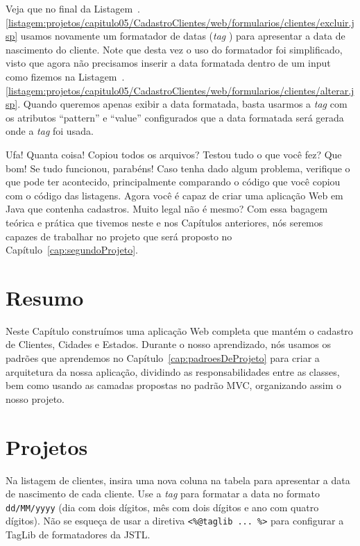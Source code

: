 
Veja que no final da Listagem~\thechapter.\ref{listagem:projetos/capitulo05/CadastroClientes/web/formularios/clientes/excluir.jsp} usamos novamente um formatador de datas (\textit{tag} ) para apresentar a data de nascimento do cliente. Note que desta vez o uso do formatador foi simplificado, visto que agora não precisamos inserir a data formatada dentro de um input como fizemos na Listagem~\thechapter.\ref{listagem:projetos/capitulo05/CadastroClientes/web/formularios/clientes/alterar.jsp}. Quando queremos apenas exibir a data formatada, basta usarmos a \textit{tag}  com os atributos ``pattern'' e ``value'' configurados que a data formatada será gerada onde a \textit{tag} foi usada.

Ufa! Quanta coisa! Copiou todos os arquivos? Testou tudo o que você fez? Que bom! Se tudo funcionou, parabéns! Caso tenha dado algum problema, verifique o que pode ter acontecido, principalmente comparando o código que você copiou com o código das listagens. Agora você é capaz de criar uma aplicação Web em Java que contenha cadastros. Muito legal não é mesmo? Com essa bagagem teórica e prática que tivemos neste e nos Capítulos anteriores, nós seremos capazes de trabalhar no projeto que será proposto no Capítulo~\ref{cap:segundoProjeto}.

\section{Resumo}

Neste Capítulo construímos uma aplicação Web completa que mantém o cadastro de Clientes, Cidades e Estados. Durante o nosso aprendizado, nós usamos os padrões que aprendemos no Capítulo~\ref{cap:padroesDeProjeto} para criar a arquitetura da nossa aplicação, dividindo as responsabilidades entre as classes, bem como usando as camadas propostas no padrão MVC, organizando assim o nosso projeto. 


\section{Projetos}

\begin{projetoSemArquivo}{}{}{}
    Na listagem de clientes, insira uma nova coluna na tabela para apresentar a data de nascimento de cada cliente. Use a \textit{tag}  para formatar a data no formato \texttt{dd/MM/yyyy} (dia com dois dígitos, mês com dois dígitos e ano com quatro dígitos). Não se esqueça de usar a diretiva \texttt{<\%@taglib ... \%>} para configurar a TagLib de formatadores da JSTL. 
\end{projetoSemArquivo}

